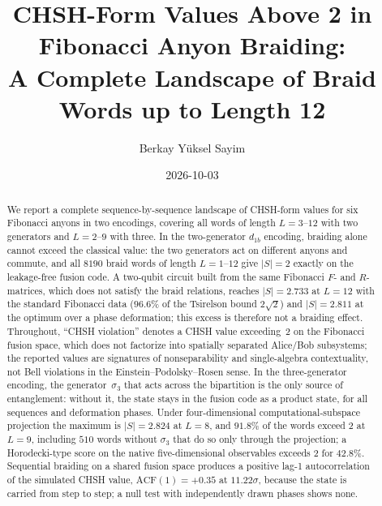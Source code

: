 \documentclass[aps,pra,twocolumn,superscriptaddress,longbibliography,floatfix,nofootinbib]{revtex4-2}
\begin{document}
\setcounter{secnumdepth}{3}

\title{CHSH-Form Values Above 2 in Fibonacci Anyon Braiding:\\ A
Complete Landscape of Braid Words up to Length 12}

\author{Berkay Y\"uksel Sayim}

\date{2026-10-03}

\begin{abstract}
We report a complete sequence-by-sequence landscape of CHSH-form values
for six Fibonacci anyons in two encodings, covering all words of length
$L=3$--$12$ with two generators and $L=2$--$9$ with three. In the
two-generator $d_{1b}$ encoding, braiding alone cannot exceed the
classical value: the two generators act on different anyons and commute,
and all $8190$ braid words of length $L=1$--$12$ give $|S|=2$ exactly on
the leakage-free fusion code. A two-qubit circuit built from the same
Fibonacci $F$- and $R$-matrices, which does not satisfy the braid
relations, reaches $|S|=2.733$ at $L=12$ with the standard Fibonacci
data ($96.6\%$ of the Tsirelson bound $2\sqrt{2}$) and $|S|=2.811$ at
the optimum over a phase deformation; this excess is therefore not a
braiding effect. Throughout, ``CHSH violation'' denotes a CHSH value
exceeding~2 on the Fibonacci fusion space, which does not factorize into
spatially separated Alice/Bob subsystems; the reported values are
signatures of nonseparability and single-algebra contextuality, not Bell
violations in the Einstein--Podolsky--Rosen sense. In the
three-generator encoding, the generator~$\sigma_3$ that acts across the
bipartition is the only source of entanglement: without it, the state
stays in the fusion code as a product state, for all sequences and
deformation phases. Under four-dimensional computational-subspace
projection the maximum is $|S|=2.824$ at $L=8$, and $91.8\%$ of the
words exceed 2 at $L=9$, including $510$ words without $\sigma_3$ that
do so only through the projection; a Horodecki-type score on the native
five-dimensional observables exceeds 2 for $42.8\%$. Sequential braiding
on a shared fusion space produces a positive lag-1 autocorrelation of
the simulated CHSH value, $\text{ACF}(1)=+0.35$ at $11.22\sigma$, because the
state is carried from step to step; a null test with
independently drawn phases shows none.
\end{abstract}
\end{document}
